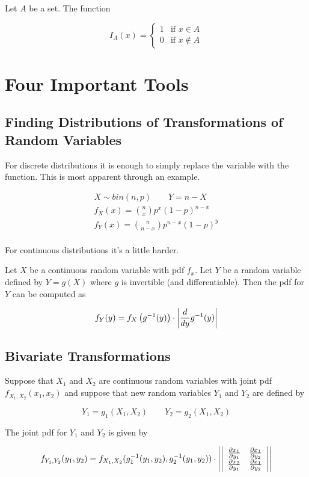     Let $A$ be a set. The function

    \[
        I_A(x) = \begin{cases}
            1 & \text{if } x \in A\\
            0 & \text{if } x \not\in A
        \end{cases}
    \]

\section{Four Important Tools}
    \subsection{Finding Distributions of Transformations of Random Variables}
    For discrete distributions it is enough to simply replace the variable with the function. This is most
    apparent through an example.

    \[
        \begin{aligned}
            X \sim bin(n, p) \qquad Y = n - X\\
            f_X(x) = \binom{n}{x} p^x {(1 - p)}^{n - x}\\
            f_Y(x) = \binom{n}{n - x} p^{n - x} {(1 - p)}^y\\
        \end{aligned}
    \]

    For continuous distributions it's a little harder.

    Let $X$ be a continuous random variable with pdf $f_x$. Let $Y$ be a random variable defined by $Y=g(X)$
    where $g$ is invertible (and differentiable). Then the pdf for $Y$ can be computed as

    \[
        f_Y(y) = f_X\left(g^{-1}(y)\right) \cdot \left\lvert \frac{d}{dy} g^{-1}(y) \right\rvert
    \]

    \subsection{Bivariate Transformations}
    Suppose that $X_1$ and $X_2$ are continuous random variables with joint pdf $f_{X_1, X_2}(x_1, x_2)$ and
    suppose that new random variables $Y_1$ and $Y_2$ are defined by

    \[
        Y_1 = g_1(X_1, X_2) \qquad Y_2 = g_2(X_1, X_2)
    \]

    The joint pdf for $Y_1$ and $Y_2$ is given by

    \[
        f_{Y_1, Y_2}(y_1, y_2) = f_{X_1, X_2}(g_1^{-1}(y_1, y_2), g^{-1}_2(y_1, y_2)) \cdot \left\lvert 
        \left|
        \begin{array}{cc}
            \frac{\partial x_1}{\partial y_1} &
            \frac{\partial x_1}{\partial y_2}\\
            \frac{\partial x_2}{\partial y_1} &
            \frac{\partial x_1}{\partial y_2}
        \end{array}
        \right| \right\rvert
    \]

